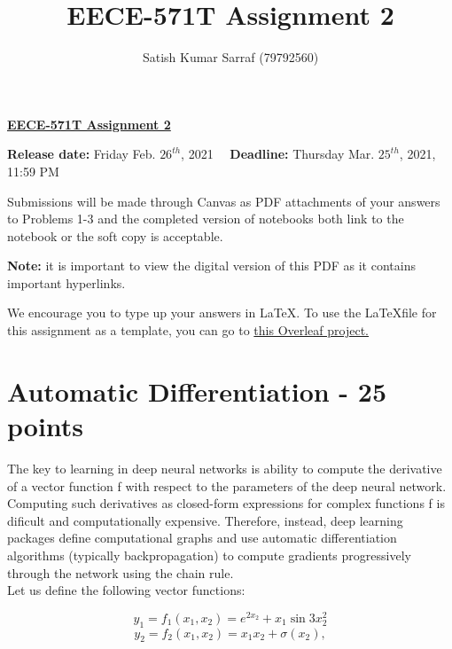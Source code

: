 \documentclass[12pt]{article}
\title{EECE-571T Assignment 2}
\author{Satish Kumar Sarraf (79792560)} %
\begin{document}

\centerline{ \underline{\Large{\textbf{EECE-571T Assignment 2}}}}

\vspace{0.5cm}

\noindent\textbf{Release date:} Friday Feb. $26^{th}$, 2021 \quad \,\,\,\, \textbf{Deadline:} Thursday  Mar. $25^{th}$, 2021, 11:59 PM
\vspace{0.8cm}

\noindent Submissions will be made through Canvas as PDF attachments of your answers to Problems 1-3 and the completed version of notebooks both link to the notebook or the soft copy is acceptable.

\vspace{0.2cm}

\noindent\textbf{Note:} it is important to view the digital version of this PDF as it contains important hyperlinks.

\vspace{0.2cm}

\noindent We encourage you to type up your answers in \LaTeX. To use the \LaTeX  file for this assignment as a template, you can go to 
\href{https://www.overleaf.com/read/vqsksjrgcvtp}{this Overleaf project.}
\vspace{0.3cm}


\section{Automatic Differentiation - 25 points}

The key to learning in deep neural networks is ability to compute the derivative of a vector function f with respect to the parameters of the deep neural network. Computing such derivatives as closed-form expressions for complex functions f is dificult and computationally expensive. Therefore, instead, deep learning packages define computational graphs and use automatic differentiation algorithms (typically backpropagation)
to compute gradients progressively through the network using the chain rule.\\ \newline
Let us define the following vector functions:

 \begin{equation}
 y_1 = f_1(x_1,x_2) = e^{2x_2} + x_1\sin{3x_2^2} 
 \end{equation}
 \begin{equation}
 y_2 = f_2(x_1,x_2) = x_1x_2 + \sigma(x_2),
 \end{equation}
\end{document}
